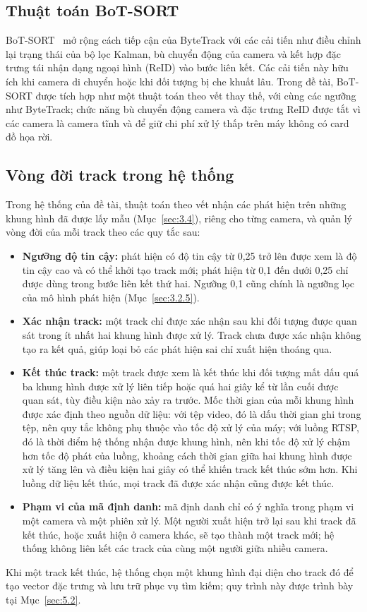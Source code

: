 \subsection{Thuật toán BoT-SORT}
\label{sec:3.3.4}

BoT-SORT~\cite{aharon2022botsort} mở rộng cách tiếp cận của ByteTrack với các cải tiến như điều chỉnh lại trạng thái của bộ lọc Kalman, bù chuyển động của camera và kết hợp đặc trưng tái nhận dạng ngoại hình (ReID) vào bước liên kết. Các cải tiến này hữu ích khi camera di chuyển hoặc khi đối tượng bị che khuất lâu. Trong đề tài, BoT-SORT được tích hợp như một thuật toán theo vết thay thế, với cùng các ngưỡng như ByteTrack; chức năng bù chuyển động camera và đặc trưng ReID được tắt vì các camera là camera tĩnh và để giữ chi phí xử lý thấp trên máy không có card đồ họa rời.

\subsection{Vòng đời track trong hệ thống}
\label{sec:3.3.5}

Trong hệ thống của đề tài, thuật toán theo vết nhận các phát hiện trên những khung hình đã được lấy mẫu (Mục~\ref{sec:3.4}), riêng cho từng camera, và quản lý vòng đời của mỗi track theo các quy tắc sau:
\begin{itemize}
    \item \textbf{Ngưỡng độ tin cậy:} phát hiện có độ tin cậy từ 0,25 trở lên được xem là độ tin cậy cao và có thể khởi tạo track mới; phát hiện từ 0,1 đến dưới 0,25 chỉ được dùng trong bước liên kết thứ hai. Ngưỡng 0,1 cũng chính là ngưỡng lọc của mô hình phát hiện (Mục~\ref{sec:3.2.5}).
    \item \textbf{Xác nhận track:} một track chỉ được xác nhận sau khi đối tượng được quan sát trong ít nhất hai khung hình được xử lý. Track chưa được xác nhận không tạo ra kết quả, giúp loại bỏ các phát hiện sai chỉ xuất hiện thoáng qua.
    \item \textbf{Kết thúc track:} một track được xem là kết thúc khi đối tượng mất dấu quá ba khung hình được xử lý liên tiếp hoặc quá hai giây kể từ lần cuối được quan sát, tùy điều kiện nào xảy ra trước. Mốc thời gian của mỗi khung hình được xác định theo nguồn dữ liệu: với tệp video, đó là dấu thời gian ghi trong tệp, nên quy tắc không phụ thuộc vào tốc độ xử lý của máy; với luồng RTSP, đó là thời điểm hệ thống nhận được khung hình, nên khi tốc độ xử lý chậm hơn tốc độ phát của luồng, khoảng cách thời gian giữa hai khung hình được xử lý tăng lên và điều kiện hai giây có thể khiến track kết thúc sớm hơn. Khi luồng dữ liệu kết thúc, mọi track đã được xác nhận cũng được kết thúc.
    \item \textbf{Phạm vi của mã định danh:} mã định danh chỉ có ý nghĩa trong phạm vi một camera và một phiên xử lý. Một người xuất hiện trở lại sau khi track đã kết thúc, hoặc xuất hiện ở camera khác, sẽ tạo thành một track mới; hệ thống không liên kết các track của cùng một người giữa nhiều camera.
\end{itemize}

Khi một track kết thúc, hệ thống chọn một khung hình đại diện cho track đó để tạo vector đặc trưng và lưu trữ phục vụ tìm kiếm; quy trình này được trình bày tại Mục~\ref{sec:5.2}.
